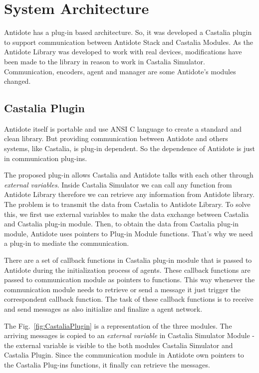 \section{System Architecture}

Antidote has a plug-in based architecture. So, it was developed a Castalia plugin to support communication between Antidote Stack and Castalia Modules. As the Antidote Library was developed to work with real devices, modifications have been made to the library in reason to work in Castalia Simulator. Communication, encoders, agent and manager are some Antidote's modules changed.

\subsection{Castalia Plugin}

Antidote itself is portable and use ANSI C language to create a standard and clean library. But providing communication between Antidote and others systems, like Castalia, is plug-in dependent. So the dependence of Antidote is just in communication plug-ins.

The proposed plug-in allows Castalia and Antidote talks with each other through \textit{external variables}. Inside Castalia Simulator we can call any function from Antidote Library therefore we can retrieve any information from Antidote library. The problem is to transmit the data from Castalia to Antidote Library. To solve this, we first use external variables to make the data exchange between Castalia and Castalia plug-in module. Then, to obtain the data from Castalia plug-in module, Antidote uses pointers to Plug-in Module functions. That's why we need a plug-in to mediate the communication. 

There are a set of callback functions in Castalia plug-in module that is passed to Antidote during the initialization process of agents. These callback functions are passed to communication module as pointers to functions. This way whenever the communication module needs to retrieve or send a message it just trigger the correspondent callback function. The task of these callback functions is to receive and send messages as also initialize and finalize a agent network.

The Fig.~\ref{fig:CastaliaPlugin} is a representation of the three modules. The arriving messages is copied to an \textit{external variable} in Castalia Simulator Module - the external variable is visible to the both modules Castalia Simulator and Castalia Plugin. Since the communication module in Antidote own pointers to the Castalia Plug-ins functions, it finally can retrieve the messages.

